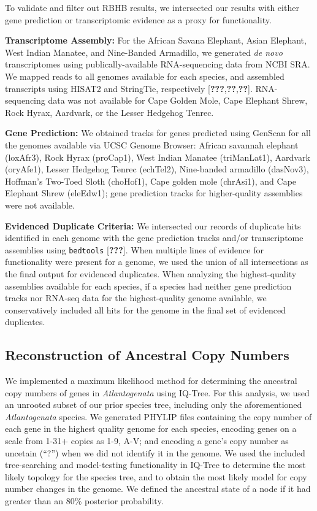 \documentclass[10pt,letterpaper]{article}
\begin{document}
To validate and filter out RBHB results, we intersected our results with
either gene prediction or transcriptomic evidence as a proxy for
functionality.

\textbf{Transcriptome Assembly:} For the African Savana Elephant, Asian
Elephant, West Indian Manatee, and Nine-Banded Armadillo, we generated
\emph{de novo} transcriptomes using publically-available RNA-sequencing
data from NCBI SRA. We mapped reads to all genomes available for each
species, and assembled transcripts using HISAT2 and StringTie,
respectively {[}{\textbf{???}},{\textbf{??}},{\textbf{??}}{]}.
RNA-sequencing data was not available for Cape Golden Mole, Cape
Elephant Shrew, Rock Hyrax, Aardvark, or the Lesser Hedgehog Tenrec.

\textbf{Gene Prediction:} We obtained tracks for genes predicted using
GenScan for all the genomes available via UCSC Genome Browser: African
savannah elephant (loxAfr3), Rock Hyrax (proCap1), West Indian Manatee
(triManLat1), Aardvark (oryAfe1), Lesser Hedgehog Tenrec (echTel2),
Nine-banded armadillo (dasNov3), Hoffman's Two-Toed Sloth (choHof1),
Cape golden mole (chrAsi1), and Cape Elephant Shrew (eleEdw1); gene
prediction tracks for higher-quality assemblies were not available.

\textbf{Evidenced Duplicate Criteria:} We intersected our records of
duplicate hits identified in each genome with the gene prediction tracks
and/or transcriptome assemblies using \texttt{bedtools}
{[}{\textbf{???}}{]}. When multiple lines of evidence for functionality
were present for a genome, we used the union of all intersections as the
final output for evidenced duplicates. When analyzing the
highest-quality assemblies available for each species, if a species had
neither gene prediction tracks nor RNA-seq data for the highest-quality
genome available, we conservatively included all hits for the genome in
the final set of evidenced duplicates.

\hypertarget{reconstruction-of-ancestral-copy-numbers}{%
\subsection{Reconstruction of Ancestral Copy
Numbers}\label{reconstruction-of-ancestral-copy-numbers}}

We implemented a maximum likelihood method for determining the ancestral
copy numbers of genes in \emph{Atlantogenata} using IQ-Tree. For this
analysis, we used an unrooted subset of our prior species tree,
including only the aforementioned \emph{Atlantogenata} species. We
generated PHYLIP files containing the copy number of each gene in the
highest quality genome for each species, encoding genes on a scale from
1-31+ copies as 1-9, A-V; and encoding a gene's copy number as uncetain
(``?'') when we did not identify it in the genome. We used the included
tree-searching and model-testing functionality in IQ-Tree to determine
the most likely topology for the species tree, and to obtain the most
likely model for copy number changes in the genome. We defined the
ancestral state of a node if it had greater than an 80\% posterior
probability.
\end{document}
